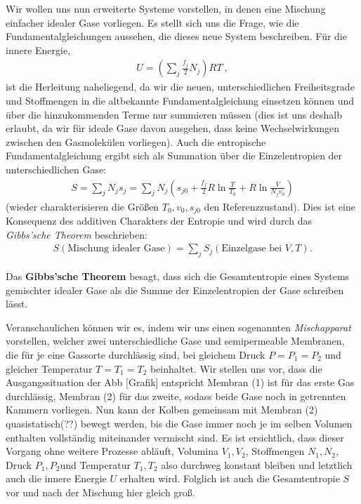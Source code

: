 Wir wollen uns nun erweiterte Systeme vorstellen, in denen eine Mischung einfacher idealer Gase vorliegen. Es stellt sich uns die Frage, wie die Fundamentalgleichungen aussehen, die dieses neue System beschreiben. Für die innere Energie, 
\begin{align*}
    \boxed{U=\left(\sum_j\frac{f_j}{2}N_j\right)RT}\:,
\end{align*}
ist die Herleitung naheliegend, da wir die neuen, unterschiedlichen Freiheitsgrade und Stoffmengen in die altbekannte Fundamentalgleichung einsetzen können und über die hinzukommenden Terme nur summieren müssen (dies ist uns deshalb erlaubt, da wir für ideale Gase davon ausgehen, dass keine Wechselwirkungen zwischen den Gasmolekülen vorliegen). Auch die entropische Fundamentalgleichung ergibt sich als Summation über die Einzelentropien der unterschiedlichen Gase: 
\begin{align*}
    \boxed{S=\sum_jN_js_j=\sum_jN_j\left(s_{j0}+\frac{f_j}{2}R\ln\frac{T}{T_0}+R\ln\frac{V}{N_jv_0}\right)}
\end{align*}
(wieder charakterisieren die Größen $T_0,v_0,s_{j0}$ den Referenzzustand).
Dies ist eine Konsequenz des additiven Charakters der Entropie und wird durch das \emph{Gibbs'sche Theorem} beschrieben: 
\begin{align*}
    \boxed{S(\text{Mischung idealer Gase})=\sum_jS_j(\text{Einzelgase bei } V,T)}.
\end{align*}
\begin{formal}
    Das \textbf{Gibbs'sche Theorem} besagt, dass sich die Gesamtentropie eines Systems gemischter idealer Gase als die Summe der Einzelentropien der Gase schreiben lässt.
\end{formal}
Veranschaulichen können wir es, indem wir uns einen sogenannten \emph{Mischapparat} vorstellen, welcher zwei unterschiedliche Gase und semipermeable Membranen, die für je eine Gassorte durchlässig sind, bei gleichem Druck $P=P_1=P_2$ und gleicher Temperatur $T=T_1=T_2$ beinhaltet. Wir stellen uns vor, dass die Ausgangssituation der Abb [Grafik] entspricht \textendash{} Membran (1) ist für das erste Gas durchlässig, Membran (2) für das zweite, sodass beide Gase noch in getrennten Kammern vorliegen. Nun kann der Kolben gemeinsam mit 
Membran (2) quasistatisch(??) bewegt werden, bis die Gase \textendash{} immer noch je im selben Volumen enthalten \textendash{} vollständig miteinander vermischt sind. Es ist ersichtlich, dass dieser Vorgang ohne weitere Prozesse abläuft, Volumina $V_1,V_2$, Stoffmengen $N_1,N_2$, Druck $P_1,P_2$und Temperatur $T_1,T_2$ also durchweg konstant bleiben und letztlich auch die innere Energie $U$ erhalten wird. Folglich ist auch die Gesamtentropie $S$ vor und nach der Mischung hier gleich groß.
